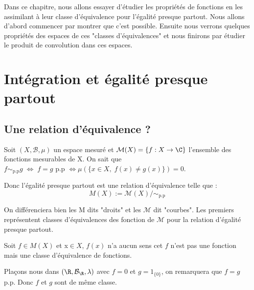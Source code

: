 \minitoc  %


Dans ce chapitre, nous allons essayer d'étudier les propriétés de fonctions en les assimilant à leur classe d'équivalence 
pour l'égalité presque partout. Nous allons d'abord commencer par montrer que c'est possible. Ensuite nous verrons quelques propriétés
des espaces de ces "classes d'équivalences" et nous finirons par étudier le produit de convolution dans ces espaces. 


\section{Intégration et égalité presque partout}

\subsection{Une relation d'équivalence ?}

Soit $(X,\mathcal{B},\mu)$ un espace mesuré et $\mathcal{M}(X) = \{f : X \rightarrow \C\}$ l'ensemble des fonctions mesurables 
de X. On sait que $ f \sim_{\text{p.p}} g \; \Longleftrightarrow \; f = g \text{ p.p } \Longleftrightarrow \mu (\{ x \in X, \; f(x) \not = g(x) \}) = 0 $. 

Donc l'égalité presque partout est une relation d'équivalence telle que :
    \[ M(X) := \mathcal{M}(X) / \sim_{\text{p.p}} \] 

On différenciera bien les M dits "droits" et les $\mathcal{M}$ dit "courbes". 
Les premiers représentent classes d'équivalences des fonction de $\mathcal{M}$ pour la relation d'égalité presque partout. 

\begin{remark}
    Soit $f \in M(X)$ et x$ \in X$, $f(x)$ n'a aucun sens cet $f$ n'est pas une fonction mais une classe d'équivalence de fonctions. 
\end{remark}

\begin{example}
    Plaçons nous dans $(\R,\mathcal{B}_\R,\lambda)$ avec $f = 0$ et $g = 1_{\{0\}}$, on remarquera que $f = g$ p.p. 
    Donc $f$ et $g$ sont de même classe. 
\end{example}

